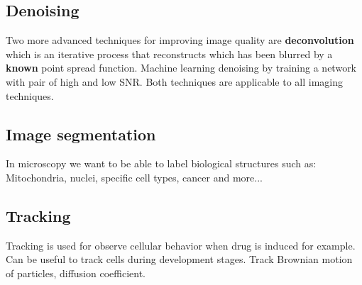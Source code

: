 	\subsection{Denoising}
	Two more advanced techniques for improving image quality are \textbf{deconvolution} which is an iterative process that reconstructs which has been blurred by a \textbf{known} point spread function. Machine learning denoising by training a network with pair of high and low SNR. Both techniques are applicable to all imaging techniques. 

	\subsection{Image segmentation}
	In microscopy we want to be able to label biological structures such as: Mitochondria, nuclei, specific cell types, cancer and more... 

	\subsection{Tracking}
	Tracking is used for observe cellular behavior when drug is induced for example. Can be useful to track cells during development stages. Track Brownian motion of particles, diffusion coefficient. 	
	  







